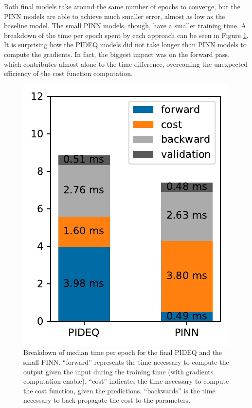 Both final models take around the same number of epochs to converge, but the \gls{PINN} models are able to achieve much smaller error, almost as low as the baseline model.
The small \gls{PINN} models, though, have a smaller training time.
A breakdown of the time per epoch spent by each approach can be seen in Figure \ref{fig:final-times}.
It is surprising how the \gls{PIDEQ} models did not take longer than \gls{PINN} models to compute the gradients.
In fact, the biggest impact was on the forward pass, which contributes almost alone to the time difference, overcoming the unexpected efficiency of the cost function computation. 

\begin{figure}[h]
    \centering
    \includegraphics{images/final_times.pdf}
    \caption{Breakdown of median time per epoch for the final \gls{PIDEQ} and the small \gls{PINN}. ``forward'' represents the time necessary to compute the output given the input during the training time (with gradients computation enable). ``cost'' indicates the time necessary to compute the cost function, given the predictions. ``backwards'' is the time necessary to back-propagate the cost to the parameters.}
    \label{fig:final-times}
\end{figure}

